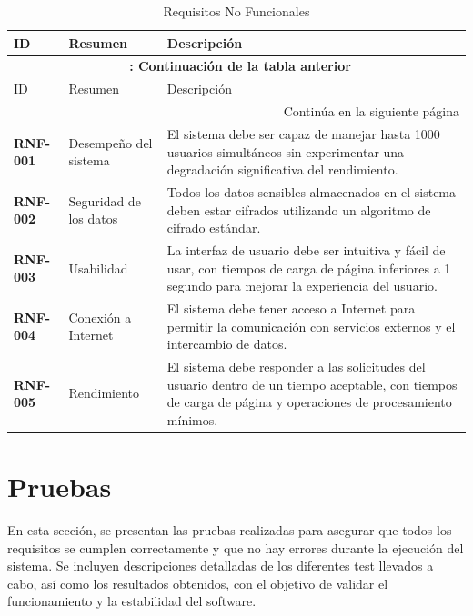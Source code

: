     \begin{longtable}{ p{2.5cm} p{4cm} p{9cm} }
        \caption{Requisitos No Funcionales} \label{tabla:RNF} \\
        \hline
        ID & Resumen & Descripción \\
        \hline
        \endfirsthead
        \multicolumn{3}{c}{{\bfseries \tablename\ \thetable{}: Continuación de la tabla anterior}} \\
        \hline
        ID & Resumen & Descripción \\
        \hline
        \endhead
        \hline \multicolumn{3}{|r|}{{Continúa en la siguiente página}} \\ \hline
        \endfoot
        \hline
        \endlastfoot
        \textbf{RNF-001} & Desempeño del sistema & El sistema debe ser capaz de manejar hasta 1000 usuarios simultáneos sin experimentar una degradación 
        significativa del rendimiento. \\
        \textbf{RNF-002} & Seguridad de los datos & Todos los datos sensibles almacenados en el sistema deben estar cifrados utilizando un algoritmo de cifrado 
        estándar. \\
        \textbf{RNF-003} & Usabilidad & La interfaz de usuario debe ser intuitiva y fácil de usar, con tiempos de carga de página inferiores a 1 segundo para 
        mejorar la experiencia del usuario. \\
        \textbf{RNF-004} &  Conexión a Internet & El sistema debe tener acceso a Internet para permitir la comunicación con servicios externos y el intercambio
         de datos. \\
        \textbf{RNF-005} & Rendimiento & El sistema debe responder a las solicitudes del usuario dentro de un tiempo aceptable, con tiempos de carga de página y
         operaciones de procesamiento mínimos. \\
    \end{longtable}

\section{Pruebas}
En esta sección, se presentan las pruebas realizadas para asegurar que todos los requisitos se cumplen correctamente y que no hay errores durante la ejecución del 
sistema. Se incluyen descripciones detalladas de los diferentes test llevados a cabo, así como los resultados obtenidos, con el objetivo de validar el 
funcionamiento y la estabilidad del software.

